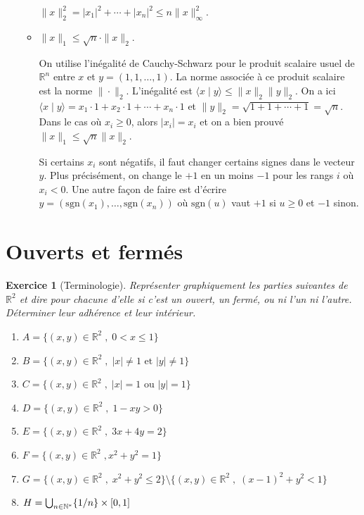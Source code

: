\documentclass[11pt,a4paper]{article}
\newcommand{\Rr}{\mathbb{R}} \newcommand{\R}{\mathbb{R}}
\renewcommand{\ge}{\geqslant} \renewcommand{\geq}{\geqslant}
\renewcommand{\le}{\leqslant} \renewcommand{\leq}{\leqslant}
\theoremstyle{exostyle}
\newtheorem{exo}{Exercice}
\newcommand{\exercice}[1]{} \newcommand{\finexercice}{}
\newcommand{\enonce}{\begin{exo}} \newcommand{\finenonce}{\end{exo}}
\begin{document}
\begin{enumerate}
\begin{itemize}
		$\|x\|_{2}^2 = |x_1|^2+\cdots+|x_n|^2 \le n \| x \|_\infty^2$.
		
		
		\item $\|x\|_{1} \leq \sqrt{n} \cdot \|x\|_{2}$.
		
		On utilise l'inégalité de Cauchy-Schwarz pour le produit scalaire usuel de $\Rr^n$ entre $x$ et $y=(1,1,\ldots,1)$. La norme associée à ce produit scalaire est la norme $\| \cdot \|_2$.
		L’inégalité est $\langle x \mid y \rangle \le \| x \|_2 \| y \|_2$.
		On a ici $\langle x \mid y \rangle = x_1\cdot1+x_2\cdot 1+\cdots +x_n\cdot 1$ et $\| y \|_2 = \sqrt{1+1+\cdots+1} = \sqrt{n}$.
		Dans le cas où $x_i\ge0$, alors $|x_i|=x_i$ et on a bien prouvé $\| x \|_1 \le \sqrt{n}\| x \|_2$.
		
		Si certains $x_i$ sont négatifs, il faut changer certains signes dans le vecteur $y$.
		Plus précisément, on change le $+1$ en un moins $-1$ pour les rangs $i$ où $x_i < 0$.
		Une autre façon de faire est d'écrire $y = (\mathrm{sgn}(x_1),\ldots,\mathrm{sgn}(x_n))$
		où $\mathrm{sgn}(u)$ vaut $+1$ si $u \ge0$ et $-1$ sinon.
			
			
	    \end{itemize}
\end{enumerate}
\fincorrection
\finexercice



\section{Ouverts et fermés}



\exercice{1780, gineste, 2001/11/01} %

\enonce[Terminologie]
Représenter graphiquement les parties suivantes de $\R^2$ et dire pour chacune d'elle si c'est un ouvert, un fermé, ou ni l'un ni l'autre. Déterminer leur adhérence et leur intérieur.
\begin{enumerate}
	\item $A = \{ (x,y) \in \R^2 \; , \; 0<x\leq 1 \}$
	\item $B = \{ (x,y) \in \R^2 \; , \;|x| \not = 1 \mbox{ et } |y| \not = 1 \} $
	\item $C = \{ (x,y) \in \R^2 \; , \; |x|  = 1 \mbox{ ou } |y| = 1 \} $
	\item $D = \{ (x,y) \in \R^2 \; , \; 1 - xy >  0 \} $
	\item $E = \{ (x,y) \in \R^2 \; , \; 3x+4y=2  \} $
	\item $F = \{ (x,y) \in \R^2 \; , x^2 + y^2 = 1 \} $
	\item $G = \{(x,y)\in\R^2\; , \; x^2+y^2\le 2\} \setminus \{(x,y)\in \R^2
\; , \; (x-1)^2+y^2<1\}$	
	\item $H = \bigcup_{n \in \mathbb{N}^*} \{ 1/n \} \times [0,1] $
\end{enumerate}
\finenonce
\end{document}
